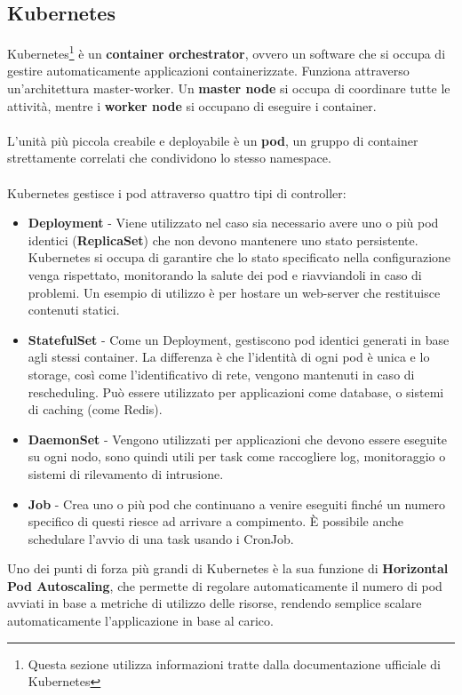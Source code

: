 \subsection{Kubernetes}
Kubernetes\footnote{Questa sezione utilizza informazioni tratte dalla documentazione ufficiale di Kubernetes\cite{kubernetesdocs}}
\`e un \textbf{container orchestrator}, ovvero un software che si occupa di gestire automaticamente applicazioni containerizzate.
Funziona attraverso un'architettura master-worker. Un \textbf{master node} si occupa di coordinare tutte le attivit\`a, mentre i \textbf{worker node} si occupano di eseguire i container.
\\\\
L'unit\`a pi\`u piccola creabile e deployabile \`e un \textbf{pod}, un gruppo di container strettamente correlati che condividono lo stesso namespace.
\\\\
Kubernetes gestisce i pod attraverso quattro tipi di controller:
\begin{itemize}
  \item \textbf{Deployment} - Viene utilizzato nel caso sia necessario avere uno o pi\`u pod identici (\textbf{ReplicaSet}) che non devono mantenere uno stato persistente. Kubernetes si occupa
    di garantire che lo stato specificato nella configurazione venga rispettato, monitorando la salute dei pod e riavviandoli in caso di problemi.
    Un esempio di utilizzo \`e per hostare un web-server che restituisce contenuti statici.
  \item \textbf{StatefulSet} - Come un Deployment, gestiscono pod identici generati in base agli stessi container. La differenza \`e che l'identit\`a di ogni pod \`e unica e lo storage, cos\`i come l'identificativo di rete,
    vengono mantenuti in caso di rescheduling. Pu\`o essere utilizzato per applicazioni come database, o sistemi di caching (come Redis).
  \item \textbf{DaemonSet} - Vengono utilizzati per applicazioni che devono essere eseguite su ogni nodo, sono quindi utili per task come raccogliere log, monitoraggio o sistemi di rilevamento di intrusione.
  \item \textbf{Job} - Crea uno o pi\`u pod che continuano a venire eseguiti finch\'e un numero specifico di questi riesce ad arrivare a compimento. \`E possibile anche schedulare l'avvio di
    una task usando i CronJob.
\end{itemize}
Uno dei punti di forza pi\`u grandi di Kubernetes \`e la sua funzione di \textbf{Horizontal Pod Autoscaling}, che permette di regolare automaticamente il numero di pod avviati in base a
metriche di utilizzo delle risorse, rendendo semplice scalare automaticamente l'applicazione in base al carico.
